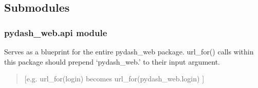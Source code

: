 \documentclass[letterpaper,10pt,english]{sphinxmanual}
\begin{document}
\begin{fulllineitems}
\label{\detokenize{pydash_web.controller.visitor_heatmap:pydash_web.controller.visitor_heatmap.daterange}}
\end{fulllineitems}


\begin{fulllineitems}
\label{\detokenize{pydash_web.controller.visitor_heatmap:pydash_web.controller.visitor_heatmap.get_hourly_data}}
\end{fulllineitems}


\begin{fulllineitems}
\label{\detokenize{pydash_web.controller.visitor_heatmap:pydash_web.controller.visitor_heatmap.visitor_heatmap}}
\end{fulllineitems}



\subsection{Submodules}
\label{\detokenize{pydash_web:submodules}}

\subsubsection{pydash\_web.api module}
\label{\detokenize{pydash_web.api:module-pydash_web.api}}\label{\detokenize{pydash_web.api:pydash-web-api-module}}\label{\detokenize{pydash_web.api::doc}}
Serves as a blueprint for the entire pydash\_web package.
url\_for() calls within this package should prepend ‘pydash\_web.’ to their input argument.
\begin{quote}

{[}e.g. url\_for(login) becomes url\_for(pydash\_web.login) {]}
\end{quote}
\end{document}
